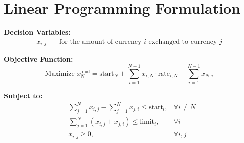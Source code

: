 \documentclass{article}
\begin{document}
\section*{Linear Programming Formulation}

\textbf{Decision Variables:}
\begin{align*}
x_{i,j} & \quad \text{for the amount of currency $i$ exchanged to currency $j$}
\end{align*}

\textbf{Objective Function:}
\[
\text{Maximize } x_N^{\text{final}} = \text{start}_N + \sum_{i=1}^{N-1} x_{i,N} \cdot \text{rate}_{i,N} - \sum_{i=1}^{N-1} x_{N,i}
\]

\textbf{Subject to:}
\begin{align*}
& \sum_{j=1}^{N} x_{i,j} - \sum_{j=1}^{N} x_{j,i} \leq \text{start}_i, & \forall i \neq N \\
& \sum_{j=1}^{N} (x_{i,j} + x_{j,i}) \leq \text{limit}_i, & \forall i \\
& x_{i,j} \geq 0, & \forall i, j
\end{align*}
\end{document}
